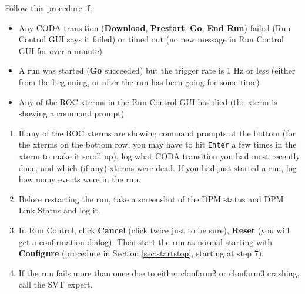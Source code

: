 \documentclass[12pt]{article}
\begin{document}
Follow this procedure if:
\begin{itemize}
\item Any CODA transition (\textbf{Download}, \textbf{Prestart}, \textbf{Go}, \textbf{End Run}) failed (Run Control GUI says it failed) or timed out (no new message in Run Control GUI for over a minute)
\item A run was started (\textbf{Go} succeeded) but the trigger rate is 1 Hz or less (either from the beginning, or after the run has been going for some time)
\item Any of the ROC xterms in the Run Control GUI has died (the xterm is showing a command prompt)
\end{itemize}
\begin{enumerate}
    \item If any of the ROC xterms are showing command prompts at the bottom 
          (for the xterms on the bottom row, you may have to hit \texttt{Enter}
          a few times in the xterm to make it scroll up), log what CODA 
          transition you had most recently done, and which (if any) xterms were
          dead. If you had just started a run, log how many events were in the
          run. 
    \item Before restarting the run, take a screenshot of the DPM status and DPM 
          Link Status and log it.
    \item In Run Control, click \textbf{Cancel} (click twice just to be sure), \textbf{Reset} (you will get a confirmation dialog). Then start the run as normal starting with \textbf{Configure} (procedure in Section \ref{sec:startstop}, starting at step 7).
    \item If the run fails more than once due to either clonfarm2 or clonfarm3 crashing, call the SVT expert.
\end{enumerate}
\end{document}
